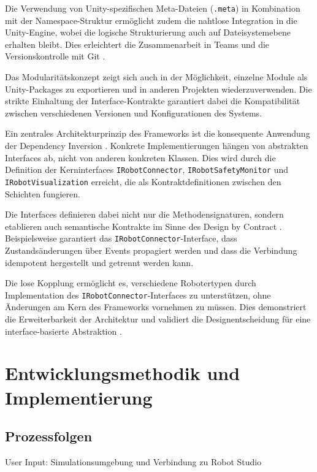 Die Verwendung von Unity-spezifischen Meta-Dateien (\texttt{.meta}) in
Kombination mit der Namespace-Struktur ermöglicht zudem die nahtlose
Integration in die Unity-Engine, wobei die logische Strukturierung auch auf
Dateisystemebene erhalten bleibt. Dies erleichtert die Zusammenarbeit in Teams
und die Versionskontrolle mit Git \cite{chacon2014pro}.

Das Modularitätskonzept zeigt sich auch in der Möglichkeit, einzelne Module als
Unity-Packages zu exportieren und in anderen Projekten wiederzuverwenden. Die
strikte Einhaltung der Interface-Kontrakte garantiert dabei die Kompatibilität
zwischen verschiedenen Versionen und Konfigurationen des Systems.

Ein zentrales Architekturprinzip des Frameworks ist die konsequente Anwendung
der Dependency Inversion \cite{Martin1996}. Konkrete Implementierungen hängen
von abstrakten Interfaces ab, nicht von anderen konkreten Klassen. Dies wird
durch die Definition der Kerninterfaces \texttt{IRobotConnector},
\texttt{IRobotSafetyMonitor} und \texttt{IRobotVisualization} erreicht, die als
Kontraktdefinitionen zwischen den Schichten fungieren.

Die Interfaces definieren dabei nicht nur die Methodensignaturen, sondern
etablieren auch semantische Kontrakte im Sinne des Design by Contract
\cite{Meyer1992}. Beispielsweise garantiert das
\texttt{IRobotConnector}-Interface, dass Zustandsänderungen über Events
propagiert werden und dass die Verbindung idempotent hergestellt und getrennt
werden kann.

Die lose Kopplung ermöglicht es, verschiedene Robotertypen durch Implementation
des \texttt{IRobotConnector}-Interfaces zu unterstützen, ohne Änderungen am
Kern des Frameworks vornehmen zu müssen. Dies demonstriert die Erweiterbarkeit
der Architektur und validiert die Designentscheidung für eine
interface-basierte Abstraktion \cite{Liskov1987}.


\section{Entwicklungsmethodik und Implementierung}
\label{sec:Implementierung_Framework}
\subsection{Prozessfolgen}
\label{ssec:Prozessfolgen}
User Input: Simulationsumgebung und Verbindung zu Robot Studio

